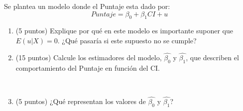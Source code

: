 \documentclass[10pt,a4paper]{article}
\begin{document}
\begin{enumerate}
Se plantea un modelo donde el Puntaje esta dado por:
$$Puntaje = \beta_0 + \beta_1 CI + u$$

\begin{enumerate}
    \item (5 puntos) Explique por qué en este modelo es importante suponer que $E(u|X)=0$. ¿Qué pasaría si este supuesto no se cumple?
    \\

    \item (15 puntos) Calcule los estimadores del modelo, $\hat{\beta_0}$ y $\hat{\beta_1}$, que describen el comportamiento del Puntaje en función del CI.

\\




    \item (5 puntos) ¿Qué representan los valores de $\hat{\beta_0}$ y $\hat{\beta_1}$?\\
\end{enumerate}

\end{enumerate}
\end{document}
